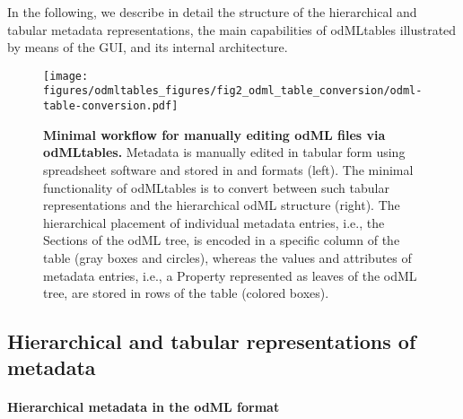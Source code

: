 {In the following, we describe in detail the structure of the hierarchical and tabular metadata representations, the main capabilities of odMLtables illustrated by means of the GUI, and its internal architecture. 


\begin{figure}[!ht]
\begin{center}
\texttt{[image: figures/odmltables\_figures/fig2\_odml\_table\_conversion/odml-table-conversion.pdf]}
\caption[Minimal workflow for manually editing odML files via odMLtables]{{\label{fig:min_workflow}
\textbf{Minimal workflow for manually editing odML files via odMLtables.} Metadata is manually edited in tabular form using spreadsheet software and stored in  and  formats (left). The minimal functionality of odMLtables is to convert between such tabular representations and the hierarchical odML structure (right). The hierarchical placement of individual metadata entries, i.e., the Sections of the odML tree, is encoded in a specific column of the table (gray boxes and circles), whereas the values and attributes of metadata entries, i.e., a Property represented as leaves of the odML tree, are stored in rows of the table (colored boxes).%
}}
\end{center}
\end{figure}

\subsection{Hierarchical and tabular representations of metadata}
\label{sec:Hierarchical-Tabular}

\paragraph{Hierarchical metadata in the odML format}
\label{sec:subodML}

}
